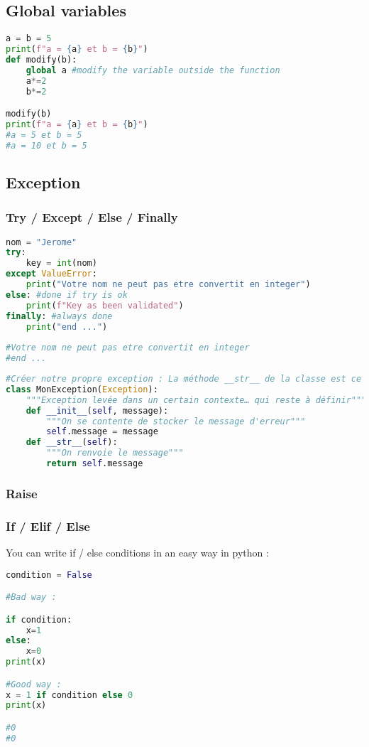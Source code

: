 \documentclass[a4paper, 12pt]{article}
\begin{document}
\subsection{Global variables}
\label{subsec:Global}
\begin{lstlisting}[language=Python]
a = b = 5
print(f"a = {a} et b = {b}")
def modify(b):
	global a #modify the variable outside the function
	a*=2
	b*=2

modify(b)
print(f"a = {a} et b = {b}")
#a = 5 et b = 5
#a = 10 et b = 5
\end{lstlisting}

\subsection{Exception}
\subsubsection{Try / Except / Else / Finally}
\label{TEEF}
\begin{lstlisting}[language=Python]
nom = "Jerome"
try:
	key = int(nom)
except ValueError:
	print("Votre nom ne peut pas etre convertit en integer")
else: #done if try is ok
	print(f"Key as been validated")
finally: #always done
	print("end ...")
	
#Votre nom ne peut pas etre convertit en integer
#end ...
\end{lstlisting}
\newline
\begin{lstlisting}[language=Python]
#Créer notre propre exception : La méthode __str__ de la classe est ce qui est appelé pour afficher le message d'erreur
class MonException(Exception):
    """Exception levée dans un certain contexte… qui reste à définir"""
    def __init__(self, message):
        """On se contente de stocker le message d'erreur"""
        self.message = message
    def __str__(self):
        """On renvoie le message"""
        return self.message
\end{lstlisting}

\subsubsection{Raise}
\label{Raise}

\subsubsection{If / Elif / Else}
\label{IEE}
You can write if / else conditions in an easy way in python :
\begin{lstlisting}[language=Python]
condition = False

#Bad way :

if condition:
	x=1
else:
	x=0
print(x)

#Good way :
x = 1 if condition else 0
print(x)

#0
#0
\end{lstlisting}
\end{document}

